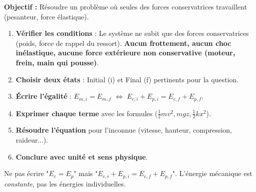 \documentclass[11pt]{article}
\begin{document}
\begin{methode}[Exploiter la conservation de l'énergie mécanique ($\Delta E_m = 0$)]
    \textbf{Objectif :} Résoudre un problème où seules des forces conservatrices travaillent (pesanteur, force élastique).
    \begin{enumerate}
        \item \textbf{Vérifier les conditions} : Le système ne subit que des forces conservatrices (poids, force de rappel du ressort). \textbf{Aucun frottement, aucun choc inélastique, aucune force extérieure non conservative (moteur, frein, main qui pousse)}.
        \item \textbf{Choisir deux états} : Initial (i) et Final (f) pertinents pour la question.
        \item \textbf{Écrire l'égalité} : $E_{m,i} = E_{m,f}$ $\Leftrightarrow$ $E_{c,i} + E_{p,i} = E_{c,f} + E_{p,f}$.
        \item \textbf{Exprimer chaque terme} avec les formules ($ \frac{1}{2}mv^2, mgz, \frac{1}{2}kx^2 $).
        \item \textbf{Résoudre l'équation} pour l'inconnue (vitesse, hauteur, compression, raideur...).
        \item \textbf{Conclure avec unité et sens physique}.
    \end{enumerate}
    \begin{attention}[Piège]
        Ne pas écrire "$E_c = E_p$" mais "$E_{c,i} + E_{p,i} = E_{c,f} + E_{p,f}$". L'énergie mécanique est \emph{constante}, pas les énergies individuelles.
    \end{attention}
\end{methode}
\end{document}
